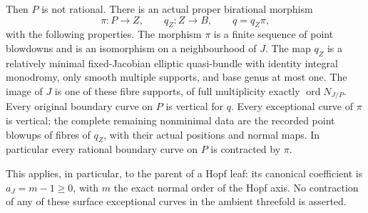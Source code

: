 \begin{proposition}
Then \(P\) is not rational. There is an actual proper
birational morphism
\[
 \pi:P\longrightarrow Z,\qquad q_Z:Z\longrightarrow B,
                    \qquad q=q_Z\pi ,
 \tag{C.NP.2}\label{cdp:eq:C.NP.2}
\]
with the following properties. The morphism \(\pi\)
is a finite sequence of point blowdowns and is an
isomorphism on a neighbourhood of \(J\). The map
\(q_Z\) is a relatively minimal fixed-Jacobian elliptic
quasi-bundle with identity integral monodromy, only
smooth multiple supports, and base genus at most one.
The image of \(J\) is one of these fibre supports,
of full multiplicity exactly
\(\operatorname{ord}N_{J/P}\).
Every original boundary curve on \(P\) is vertical
for \(q\). Every exceptional curve of \(\pi\) is
vertical; the complete remaining nonminimal data
are the recorded point blowups of fibres of \(q_Z\),
with their actual positions and normal maps.
In particular every rational boundary curve on
\(P\) is contracted by \(\pi\).

This applies, in particular, to the parent of a
Hopf leaf: its canonical coefficient is
\(a_J=m-1\ge0\), with \(m\) the exact normal
order of the Hopf axis. No contraction of any
of these surface exceptional curves in the
ambient threefold is asserted.
\end{proposition}

